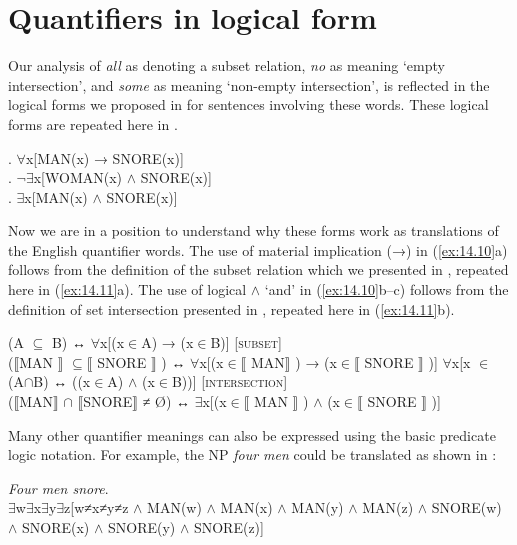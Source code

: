 \section{Quantifiers in logical form}\label{sec:14.3}

Our analysis of \textit{all} as denoting a subset relation, \textit{no} as meaning ‘empty intersection’, and \textit{some} as meaning ‘non-empty intersection’, is reflected in the logical forms we proposed in  for sentences involving these words. These logical forms are repeated here in .


\ea \label{ex:14.10}
.  ${\forall}$x[MAN(x) → SNORE(x)]\\
.  ${\lnot}$${\exists}$x[WOMAN(x) $\wedge$ SNORE(x)]\\
.  ${\exists}$x[MAN(x) $\wedge$ SNORE(x)]
                       \z
\z


Now we are in a position to understand why these forms work as translations of the English quantifier words. The use of material implication (→) in (\ref{ex:14.10}a) follows from the definition of the subset relation which we presented in , repeated here in (\ref{ex:14.11}a). The use of logical $\wedge$ ‘and’ in (\ref{ex:14.10}b--c) follows from the definition of set intersection presented in , repeated here in (\ref{ex:14.11}b).


\ea \label{ex:14.11}
\ea 
\small
(A ${\subseteq}$ B)  ↔   ${\forall}$x[(x${\in}$A) → (x${\in}$B)]  \hfill [\textsc{subset}] \\
  ($\llbracket$MAN $\rrbracket$  ${\subseteq} \llbracket$ SNORE $\rrbracket$ )  ↔   ${\forall}$x[(x${\in}\llbracket$ MAN$\rrbracket$ ) → (x${\in}\llbracket$ SNORE $\rrbracket$ )]
\ex 
\small
${\forall}$x[x ${\in}$ (A${\cap}$B)  ↔   ((x${\in}$A) $\wedge$ (x${\in}$B))]  \hfill [\textsc{intersection}] \\
  ($\llbracket$MAN$\rrbracket$ ${\cap}$ $\llbracket$SNORE$\rrbracket$  ≠ \O) ↔   ${\exists}$x[(x${\in}\llbracket$ MAN $\rrbracket$ ) $\wedge$ (x${\in} \llbracket$  SNORE $\rrbracket$ )]
\z \z
\normalsize

Many other quantifier meanings can also be expressed using the basic predicate logic notation. For example, the NP \textit{four men} could be translated as shown in :


\ea \label{ex:14.12}
\textit{Four men snore}.\\
${\exists}$w${\exists}$x${\exists}$y${\exists}$z[w≠x≠y≠z $\wedge$ MAN(w) $\wedge$ MAN(x) $\wedge$ MAN(y) $\wedge$ MAN(z) $\wedge$ SNORE(w) $\wedge$ SNORE(x) $\wedge$ SNORE(y) $\wedge$ SNORE(z)]
\z


